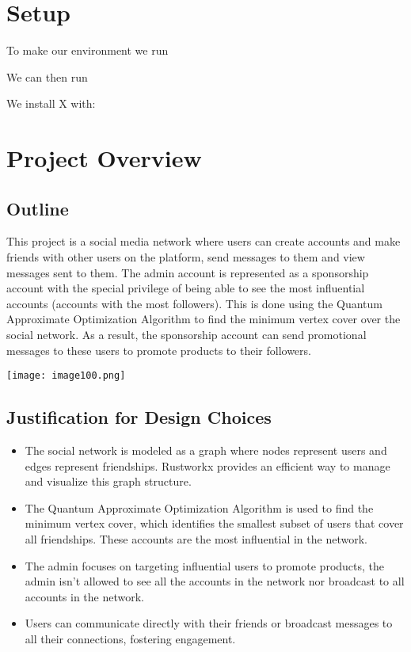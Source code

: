 \documentclass[8pt]{article}
\newenvironment{Figure}
  {\par\medskip\noindent\minipage{\linewidth}}
  {\endminipage\par\medskip}
\begin{document}
\lstset{style=mystyle}
\begin{multicols}{2}
[
]
\section{Setup}
To make our environment we run

We can then run

We install X with:


\section{Project Overview }
\subsection{Outline}
This project is a social media network where users can create accounts and make friends with other users on the platform, send messages to them and view messages sent to them. The admin account is represented as a sponsorship account with the
 special privilege of being able to see the most influential accounts (accounts with the most followers). This is done using the Quantum Approximate Optimization Algorithm to find the minimum vertex cover over the social network.
 As a result, the sponsorship account can send promotional messages to these users to promote products to their followers.




\begin{Figure}
 \centering
 \texttt{[image: image100.png]}
\end{Figure}

\subsection{Justification for Design Choices}
\begin{itemize}
  \item The social network is modeled as a graph where nodes represent users and edges represent friendships. Rustworkx provides an efficient way to manage and visualize this graph structure.
  \item The Quantum Approximate Optimization Algorithm is used to find the minimum vertex cover, which identifies the smallest subset of users that cover all friendships. These accounts are the most influential in the network.
  \item The admin focuses on targeting influential users to promote products, the admin isn't allowed to see all the accounts in the network nor broadcast to all accounts in the network.
  \item Users can communicate directly with their friends or broadcast messages to all their connections, fostering engagement.
\end{itemize}


\end{multicols}
\end{document}
